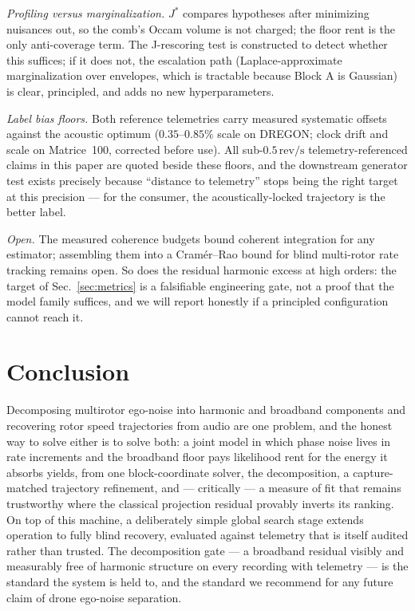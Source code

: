\documentclass[journal]{IEEEtran}
\newcommand{\revps}{\ensuremath{\,\mathrm{rev/s}}}
\newcommand{\Jobj}{\ensuremath{J}}
\begin{document}
\emph{Profiling versus marginalization.} $\Jobj^\ast$ compares
hypotheses after minimizing nuisances out, so the comb's Occam volume is
not charged; the floor rent is the only anti-coverage term. The
J-rescoring test is constructed to detect whether this suffices; if it
does not, the escalation path (Laplace-approximate marginalization over
envelopes, which is tractable because Block A is Gaussian) is clear,
principled, and adds no new hyperparameters.

\emph{Label bias floors.} Both reference telemetries carry measured
systematic offsets against the acoustic optimum ($0.35$--$0.85\%$ scale
on DREGON; clock drift and scale on Matrice~100, corrected before use).
All sub-$0.5\revps$ telemetry-referenced claims in this paper are quoted
beside these floors, and the downstream generator test exists precisely
because ``distance to telemetry'' stops being the right target at this
precision --- for the consumer, the acoustically-locked trajectory is
the better label.

\emph{Open.} The measured coherence budgets bound coherent integration
for any estimator; assembling them into a Cram\'er--Rao bound for blind
multi-rotor rate tracking remains open. So does the residual harmonic
excess at high orders: the target of Sec.~\ref{sec:metrics} is a
falsifiable engineering gate, not a proof that the model family
suffices, and we will report honestly if a principled configuration
cannot reach it.

\section{Conclusion}
\label{sec:conclusion}

Decomposing multirotor ego-noise into harmonic and broadband components
and recovering rotor speed trajectories from audio are one problem, and
the honest way to solve either is to solve both: a joint model in which
phase noise lives in rate increments and the broadband floor pays
likelihood rent for the energy it absorbs yields, from one
block-coordinate solver, the decomposition, a capture-matched trajectory
refinement, and --- critically --- a measure of fit that remains
trustworthy where the classical projection residual provably inverts
its ranking. On top of this machine, a deliberately simple global search
stage extends operation to fully blind recovery, evaluated against
telemetry that is itself audited rather than trusted. The decomposition
gate --- a broadband residual visibly and measurably free of harmonic
structure on every recording with telemetry --- is the standard the
system is held to, and the standard we recommend for any future claim of
drone ego-noise separation.



\end{document}
